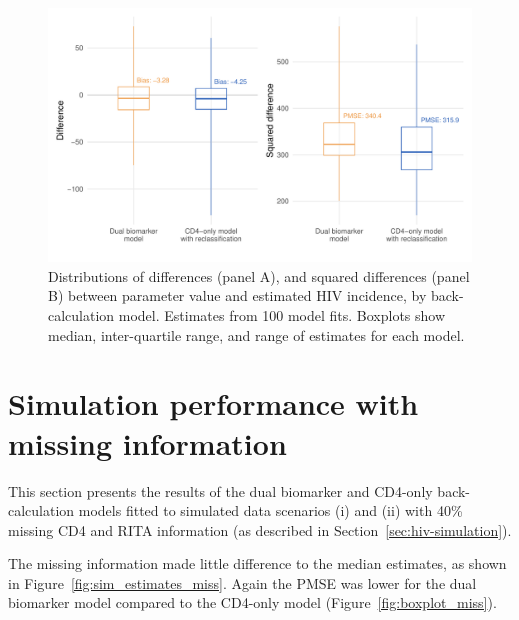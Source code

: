 \begin{figure}
  \centering
  \includegraphics[width=\textwidth]{incidence_mse_reclass.pdf}
  \caption[Distributions of differences and squared differences between parameter value and estimated HIV incidence, by back-calculation model]{Distributions of differences (panel A), and squared differences (panel B) between parameter value and estimated HIV incidence, by back-calculation model. Estimates from 100 model fits. Boxplots show median, inter-quartile range, and range of estimates for each model.}\label{fig:boxplot_reclass}
\end{figure}

\section{Simulation performance with missing information}\label{appendix:simmissing}

This section presents the results of the dual biomarker and CD4-only back-calculation models fitted to simulated data scenarios (i) and (ii) with 40\% missing CD4 and RITA information (as described in Section~\ref{sec:hiv-simulation}).

The missing information made little difference to the median estimates, as shown in Figure~\ref{fig:sim_estimates_miss}. Again the PMSE was lower for the dual biomarker model compared to the CD4-only model (Figure~\ref{fig:boxplot_miss}).

